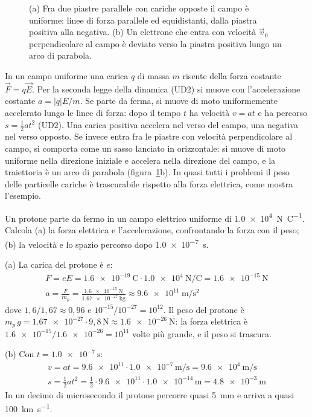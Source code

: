 \begin{figure}[h]
\centering

\caption{(a) Fra due piastre parallele con cariche opposte il campo è uniforme: linee di forza parallele ed equidistanti, dalla piastra positiva alla negativa. (b) Un elettrone che entra con velocità $\vec v_0$ perpendicolare al campo è deviato verso la piastra positiva lungo un arco di parabola.}
\label{fig:ud6-piastre}
\end{figure}

In un campo uniforme una carica $q$ di massa $m$ risente della forza costante $\vec F = q\vec E$. Per la seconda legge della dinamica (UD2) si muove con l'accelerazione costante $a = |q|E/m$. Se parte da ferma, si muove di moto uniformemente accelerato lungo le linee di forza: dopo il tempo $t$ ha velocità $v = at$ e ha percorso $s = \frac12 at^{2}$ (UD2). Una carica positiva accelera nel verso del campo, una negativa nel verso opposto. Se invece entra fra le piastre con velocità perpendicolare al campo, si comporta come un sasso lanciato in orizzontale: si muove di moto uniforme nella direzione iniziale e accelera nella direzione del campo, e la traiettoria è un arco di parabola (figura~\ref{fig:ud6-piastre}b). In quasi tutti i problemi il peso delle particelle cariche è trascurabile rispetto alla forza elettrica, come mostra l'esempio.

\begin{esempio}
Un protone parte da fermo in un campo elettrico uniforme di \SI{1,0e4}{\newton\per\coulomb}. Calcola (a) la forza elettrica e l'accelerazione, confrontando la forza con il peso; (b) la velocità e lo spazio percorso dopo \SI{1,0e-7}{\second}.

(a) La carica del protone è $e$:
\begin{gather*}
  F = eE = \SI{1,6e-19}{\coulomb} \cdot \SI{1,0e4}{\newton\per\coulomb} = \SI{1,6e-15}{\newton}
  \\
  a = \frac{F}{m_p} = \frac{\SI{1,6e-15}{\newton}}{\SI{1,67e-27}{\kilo\gram}} \approx \SI{9,6e11}{\metre\per\second\squared}
\end{gather*}
dove $1{,}6/1{,}67 \approx 0{,}96$ e $10^{-15}/10^{-27} = 10^{12}$. Il peso del protone è $m_p\,g = \num{1,67e-27} \cdot 9{,}8\,\si{\newton} \approx \SI{1,6e-26}{\newton}$: la forza elettrica è $\num{1,6e-15}/\num{1,6e-26} = 10^{11}$ volte più grande, e il peso si trascura.

(b) Con $t = \SI{1,0e-7}{\second}$:
\begin{gather*}
  v = at = \num{9,6e11} \cdot \num{1,0e-7}\,\si{\metre\per\second} = \SI{9,6e4}{\metre\per\second}
  \\
  s = \tfrac12 at^{2} = \tfrac12 \cdot \num{9,6e11} \cdot \num{1,0e-14}\,\si{\metre} = \SI{4,8e-3}{\metre}
\end{gather*}
In un decimo di microsecondo il protone percorre quasi \SI{5}{\milli\metre} e arriva a quasi \SI{100}{\kilo\metre\per\second}.
\end{esempio}

